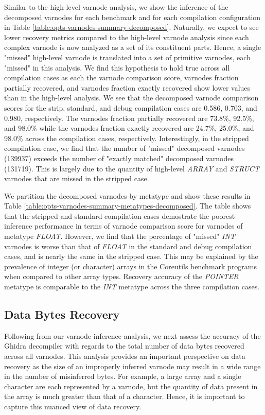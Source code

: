\documentclass[a4paper,twoside]{article}
\begin{document}
Similar to the high-level varnode analysis, we show the inference of the decomposed varnodes for each benchmark and for each compilation configuration in Table \ref{table:opts-varnodes-summary-decomposed}. Naturally, we expect to see lower recovery metrics compared to the high-level varnode analysis since each complex varnode is now analyzed as a set of its constituent parts. Hence, a single "missed" high-level varnode is translated into a set of primitive varnodes, each "missed" in this analysis. We find this hypothesis to hold true across all compilation cases as each the varnode comparison score, varnodes fraction partially recovered, and varnodes fraction exactly recovered show lower values than in the high-level analysis. We see that the decomposed varnode comparison scores for the strip, standard, and debug compilation cases are 0.586, 0.703, and 0.980, respectively. The varnodes fraction partially recovered are 73.8\%, 92.5\%, and 98.0\% while the varnodes fraction exactly recovered are 24.7\%, 25.0\%, and 98.0\% across the compilation cases, respectively. Interestingly, in the stripped compilation case, we find that the number of "missed" decomposed varnodes (139937) exceeds the number of "exactly matched" decomposed varnodes (131719). This is largely due to the quantity of high-level \emph{ARRAY} and \emph{STRUCT} varnodes that are missed in the stripped case.



We partition the decomposed varnodes by metatype and show these results in Table \ref{table:opts-varnodes-summary-metatypes-decomposed}. The table shows that the stripped and standard compilation cases demostrate the poorest inference performance in terms of varnode comparison score for varnodes of metatype \emph{FLOAT}. However, we find that the percentage of "missed" \emph{INT} varnodes is worse than that of \emph{FLOAT} in the standard and debug compilation cases, and is nearly the same in the stripped case. This may be explained by the prevalence of integer (or character) arrays in the Coreutils benchmark programs when compared to other array types. Recovery accuracy of the \emph{POINTER} metatype is comparable to the \emph{INT} metatype across the three compilation cases.

\subsection{Data Bytes Recovery}

Following from our varnode inference analysis, we next assess the accuracy of the Ghidra decompiler with regards to the total number of data bytes recovered across all varnodes. This analysis provides an important perspective on data recovery as the size of an improperly inferred varnode may result in a wide range in the number of misinferred bytes. For example, a large array and a single character are each represented by a varnode, but the quantity of data present in the array is much greater than that of a character. Hence, it is important to capture this nuanced view of data recovery.
\end{document}
